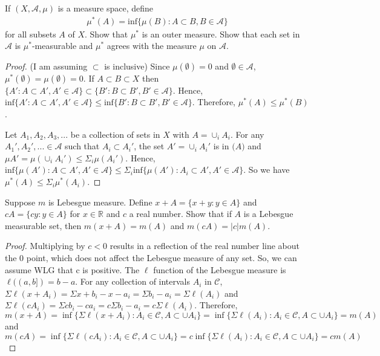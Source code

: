 \documentclass[10pt]{article}
\newcommand{\R}{\mathbb{R}}
\newenvironment{problem}[2][Problem]{\begin{trivlist}
		\item[\hskip \labelsep {\bfseries #1}\hskip \labelsep {\bfseries #2.}]}{\end{trivlist}}
\begin{document}
	\begin{problem}{3}
		If $(X, \mathcal{A}, \mu)$ is a measure space, define
		\begin{align*}
			\mu^*(A) = \text{inf}\{\mu(B) : A \subset B, B \in \mathcal{A}\}
		\end{align*}	
		for all subsets $A$ of $X$. Show that $\mu^*$ is an outer measure. Show that each set in $\mathcal{A}$ is $\mu^*$-measurable and $\mu^*$ agrees with the measure $\mu$ on $\mathcal{A}$.
		\begin{proof}
			(I am assuming $\subset$ is inclusive) Since $\mu(\emptyset) = 0$ and $\emptyset \in \mathcal{A}$, $\mu^*(\emptyset) = \mu(\emptyset) = 0$. If $A \subset B \subset X$ then $\{A' : A \subset A', A' \in \mathcal{A}\} \subset \{B' : B \subset B', B' \in \mathcal{A}\}$. Hence, $\text{inf}\{A' : A \subset A', A' \in \mathcal{A}\} \leq \text{inf}\{B' : B \subset B', B' \in \mathcal{A}\}$. Therefore, $\mu^*(A) \leq \mu^*(B)$.
			
			Let $A_1, A_2, A_3, ...$ be a collection of sets in $X$ with $A = \cup_i A_i$. For any $A_1', A_2', ... \in \mathcal{A}$ such that $A_i \subset A_i'$, the set $A' = \cup_i A_i'$ is in $\mathcal(A)$ and $\mu{A'} = \mu(\cup_iA_i') \leq \Sigma_i\mu(A_i')$. Hence, $\text{inf}\{\mu(A') : A \subset A', A' \in \mathcal{A}\} \leq \Sigma_i \text{inf}\{ \mu(A'): A_i \subset A', A' \in \mathcal{A}\}$. So we have $\mu^*(A) \leq \Sigma_i \mu^*(A_i)$. 
		\end{proof}
	\end{problem}
	
	\begin{problem}{5}
		Suppose $m$ is Lebesgue measure. Define $x + A = \{x + y : y \in A\}$ and $cA = \{cy : y \in A\}$ for $x \in \R$ and $c$ a real number. Show that if $A$ is a Lebesgue measurable set, then $m(x + A) = m(A)$ and $m(cA) = |c|m(A)$.
		\begin{proof}
			Multiplying by $c < 0$ results in a reflection of the real number line about the 0 point, which does not affect the Lebesgue measure of any set. So, we can assume WLG that c is positive. The $\ell$ function of the Lebesgue measure is $\ell((a,b])=b - a$. For any collection of intervals $A_i$ in $\mathcal{C}$, $\Sigma \ell(x+A_i) = \Sigma x + b_i - x - a_i = \Sigma b_i - a_i = \Sigma \ell(A_i)$ and $\Sigma \ell(cA_i) = \Sigma cb_i - ca_i = c\Sigma b_i - a_i = c\Sigma \ell(A_i)$. Therefore, $m(x+A) = \inf\{\Sigma \ell(x + A_i) : A_i \in \mathcal{C}, A \subset \cup A_i\} = \inf\{\Sigma \ell(A_i) : A_i \in \mathcal{C}, A \subset \cup A_i\} = m(A)$ and $m(cA) = \inf\{\Sigma \ell(cA_i) : A_i \in \mathcal{C}, A \subset \cup A_i\} = c\inf\{\Sigma \ell(A_i) : A_i \in \mathcal{C}, A \subset \cup A_i\} = cm(A)$
		\end{proof}
	\end{problem}
	
\end{document}
